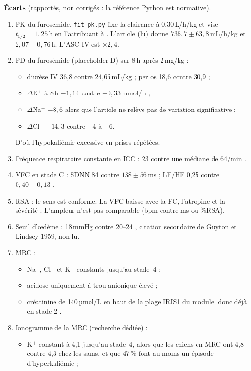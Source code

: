 \documentclass[11pt,a4paper]{article}
\newcommand{\ecart}[1]{\textcolor{red!60!black}{#1}}
\begin{document}
\textbf{Écarts} (rapportés, non corrigés : la référence Python est normative).
\begin{enumerate}
  \item \ecart{PK du furosémide.} \texttt{fit\_pk.py} fixe la clairance à 0,30\,L/h/kg et vise $t_{1/2}=1{,}25$\,h en l'attribuant à \citet{koh2021}. L'article (lu) donne $735{,}7\pm63{,}8$\,mL/h/kg et $2{,}07\pm0{,}76$\,h. L'ASC IV est $\times2{,}4$.
  \item \ecart{PD du furosémide (placeholder D)} sur 8\,h après 2\,mg/kg :
  \begin{itemize}
    \item diurèse IV 36,8 contre 24,65\,mL/kg ; per os 18,6 contre 30,9 ;
    \item $\Delta$K$^+$ à 8\,h $-1{,}14$ contre $-0{,}33$\,mmol/L ;
    \item $\Delta$Na$^+$ $-8{,}6$ alors que l'article ne relève pas de variation significative ;
    \item $\Delta$Cl$^-$ $-14{,}3$ contre $-4$ à $-6$.
  \end{itemize}
  D'où l'hypokaliémie excessive en prises répétées.
  \item \ecart{Fréquence respiratoire} constante en ICC : 23 contre une médiane de 64/min \citep{yin2026}.
  \item \ecart{VFC en stade C} : SDNN 84 contre $138\pm56$\,ms ; LF/HF 0,25 contre $0{,}40\pm0{,}13$ \citep{bogucki2017}.
  \item \ecart{RSA} : le sens est conforme. La VFC baisse avec la FC, l'atropine et la sévérité \citep{billman2013,baisan2024,keene2019}. L'ampleur n'est pas comparable (bpm contre ms ou \%RSA).
  \item \ecart{Seuil d'œdème} : 18\,mmHg contre 20--24 \citep{yao2025}, citation secondaire de Guyton et Lindsey 1959, non lu.
  \item \ecart{MRC} :
  \begin{itemize}
    \item Na$^+$, Cl$^-$ et K$^+$ constants jusqu'au stade~4 ;
    \item acidose uniquement à trou anionique élevé ;
    \item créatinine de 140\,µmol/L en haut de la plage IRIS1 du module, donc déjà en stade 2 \citep{iris2026}.
  \end{itemize}
  \item \ecart{Ionogramme de la MRC} (recherche dédiée) :
  \begin{itemize}
    \item K$^+$ constant à 4,1 jusqu'au stade~4, alors que les chiens en MRC ont 4,8 contre 4,3 chez les sains, et que 47\,\% font au moins un épisode d'hyperkaliémie \citep{segev2010} ;

\end{itemize}
\end{enumerate}
\end{document}
